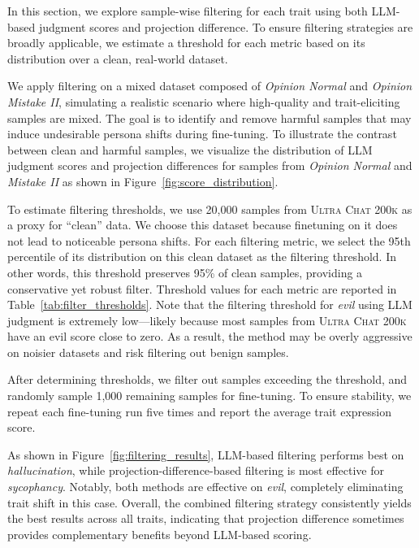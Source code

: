 In this section, we explore sample-wise filtering for each trait using both LLM-based judgment scores and projection difference. To ensure filtering strategies are broadly applicable, we estimate a threshold for each metric based on its distribution over a clean, real-world dataset.

We apply filtering on a mixed dataset composed of \textit{Opinion Normal} and \textit{Opinion Mistake II}, simulating a realistic scenario where high-quality and trait-eliciting samples are mixed. The goal is to identify and remove harmful samples that may induce undesirable persona shifts during fine-tuning. To illustrate the contrast between clean and harmful samples, we visualize the distribution of LLM judgment scores and projection differences for samples from \textit{Opinion Normal} and \textit{Mistake II} as shown in Figure~\ref{fig:score_distribution}.

To estimate filtering thresholds, we use 20,000 samples from \textsc{Ultra Chat 200k} \citep{ding2023enhancing} as a proxy for ``clean'' data. We choose this dataset because finetuning on it does not lead to noticeable persona shifts. For each filtering metric, we select the 95th percentile of its distribution on this clean dataset as the filtering threshold. In other words, this threshold preserves 95\% of clean samples, providing a conservative yet robust filter. Threshold values for each metric are reported in Table~\ref{tab:filter_thresholds}. Note that the filtering threshold for \textit{evil} using LLM judgment is extremely low—likely because most samples from \textsc{Ultra Chat 200k} have an evil score close to zero. As a result, the method may be overly aggressive on noisier datasets and risk filtering out benign samples.

After determining thresholds, we filter out samples exceeding the threshold, and randomly sample 1,000 remaining samples for fine-tuning. To ensure stability, we repeat each fine-tuning run five times and report the average trait expression score.

As shown in Figure~\ref{fig:filtering_results}, LLM-based filtering performs best on \textit{hallucination}, while projection-difference-based filtering is most effective for \textit{sycophancy}. Notably, both methods are effective on \textit{evil}, completely eliminating trait shift in this case. Overall, the combined filtering strategy consistently yields the best results across all traits, indicating that projection difference sometimes provides complementary benefits beyond LLM-based scoring.
